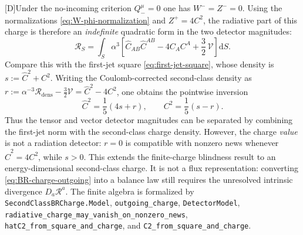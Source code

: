 \documentclass[11pt,a4paper]{article}
\newcommand{\cR}{\mathcal{R}}
\newcommand{\cV}{\mathcal{V}}
\newcommand{\diff}{\mathrm{d}}
\newcommand{\statusD}{\textsf{[D]}}
\begin{document}
\statusD Under the no-incoming criterion \(Q_-^\mu=0\) one has \(W^-=Z^-=0\).  Using the normalizations \eqref{eq:W-phi-normalization} and \(Z^+=4C^2\), the radiative part of this charge is therefore an \emph{indefinite} quadratic form in the two detector magnitudes:
\begin{equation}\label{eq:BR-charge-outgoing}
  \cR_S
  =
  \int_S
  \alpha^3
  \left[
  \hat C_{AB}\hat C^{AB}
  -
  4 C_AC^A
  +\frac32\,\cV
  \right]\diff S .
\end{equation}
Compare this with the first-jet square \eqref{eq:first-jet-square}, whose density is
\(s:=\hat C^2+C^2\).  Writing the Coulomb-corrected second-class density as
\(r:=\alpha^{-3}\cR_{\mathrm{dens}}-\tfrac32\cV=\hat C^2-4C^2\), one obtains the pointwise inversion
\begin{equation}\label{eq:two-charge-detector-inversion}
  \hat C^2=\frac15(4s+r),
  \qquad
  C^2=\frac15(s-r) .
\end{equation}
Thus the tensor and vector detector magnitudes can be separated by combining the first-jet norm with the second-class charge density.  However, the charge \emph{value} is not a radiation detector: \(r=0\) is compatible with nonzero news whenever \(\hat C^2=4C^2\), while \(s>0\).  This extends the finite-charge blindness result to an energy-dimensional second-class charge.  It is not a flux representation: converting \eqref{eq:BR-charge-outgoing} into a balance law still requires the unresolved intrinsic divergence \(D_a\cR^a\).  The finite algebra is formalized by \texttt{SecondClassBRCharge.Model}, \texttt{outgoing\_charge}, \texttt{DetectorModel}, \texttt{radiative\_charge\_may\_vanish\_on\_nonzero\_news}, \texttt{hatC2\_from\_square\_and\_charge}, and \texttt{C2\_from\_square\_and\_charge}.
\end{document}
